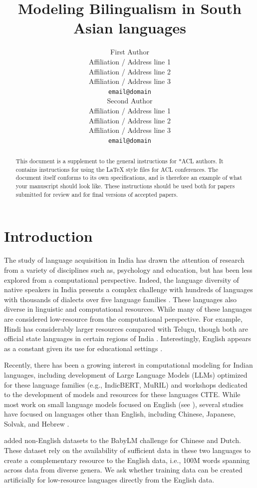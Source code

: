 \documentclass[11pt]{article}
\title{Modeling Bilingualism in South Asian languages}
\author{First Author \\
  Affiliation / Address line 1 \\
  Affiliation / Address line 2 \\
  Affiliation / Address line 3 \\
  \texttt{email@domain} \\\And
  Second Author \\
  Affiliation / Address line 1 \\
  Affiliation / Address line 2 \\
  Affiliation / Address line 3 \\
  \texttt{email@domain} \\}
\begin{document}
\maketitle
\begin{abstract}
This document is a supplement to the general instructions for *ACL authors. It contains instructions for using the \LaTeX{} style files for ACL conferences.
The document itself conforms to its own specifications, and is therefore an example of what your manuscript should look like.
These instructions should be used both for papers submitted for review and for final versions of accepted papers.
\end{abstract}

\section{Introduction}

The study of language acquisition in India has drawn the attention of research from a variety of disciplines such as, psychology and education, but has been less explored from a computational perspective. Indeed, the language diversity of native speakers in India presents a complex challenge with hundreds of languages with thousands of dialects over five language families \cite{mohanty2006multilingualism}. These languages also diverse in linguistic and computational resources. While many of these languages are considered low-resource from the computational perspective. For example, Hindi has considerably larger resources compared with Telugu, though both are official state languages in certain regions of India \cite{mohanty2010languages,philip2021revisiting}. Interestingly, English appears as a constant given its use for educational settings \cite{mohanty2006multilingualism}.

Recently, there has been a growing interest in computational modeling for Indian languages, including development of Large Language Models (LLMs) optimized for these language families (e.g., IndicBERT, MuRIL) \cite{dabre2022indicbart,khanuja2021muril} and workshops dedicated to the development of models and resources for these languages CITE. While most work on small language models focused on English (see \cite{charpentier2025babylm,hu2024findings}), several studies have focused on languages other than English, including Chinese, Japanese, Solvak, and Hebrew \cite{gao2025bliss,krivs2025slovakbabylm,gelboim2025tafberta}. 

\citep{choshen2026babylm} added non-English datasets to the BabyLM challenge for Chinese and Dutch. These dataset rely on the availability of sufficient data in these two languages to create a complementary resource to the English data, i.e., 100M words spanning across data from diverse genera. We ask whether training data can be created artificially for low-resource languages directly from the English data. 
\end{document}
